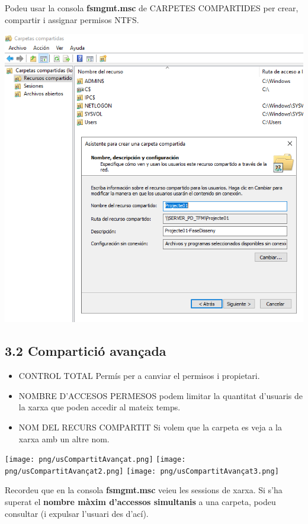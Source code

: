 \documentclass[
  a4paper,
]{article}
\begin{document}
Podeu usar la consola \textbf{fsmgmt.msc} de CARPETES COMPARTIDES per
crear, compartir i assignar permisos NTFS.

\includegraphics{png/CC1.png}

\subsection{3.2 Compartició avançada}\label{comparticiuxf3-avanuxe7ada}

\begin{itemize}
\item
  CONTROL TOTAL Permís per a canviar el permisos i propietari.
\item
  NOMBRE D'ACCESOS PERMESOS podem limitar la quantitat d'usuaris de la
  xarxa que poden accedir al mateix temps.
\item
  NOM DEL RECURS COMPARTIT Si volem que la carpeta es veja a la xarxa
  amb un altre nom.
\end{itemize}

\texttt{[image: png/usCompartitAvançat.png]}
\texttt{[image: png/usCompartitAvançat2.png]}
\texttt{[image: png/usCompartitAvançat3.png]}

Recordeu que en la consola \textbf{fsmgmt.msc} veieu les sessions de
xarxa. Si s'ha superat el \textbf{nombre màxim d'accessos simultanis} a
una carpeta, podeu consultar (i expulsar l'usuari des d'ací).
\end{document}
